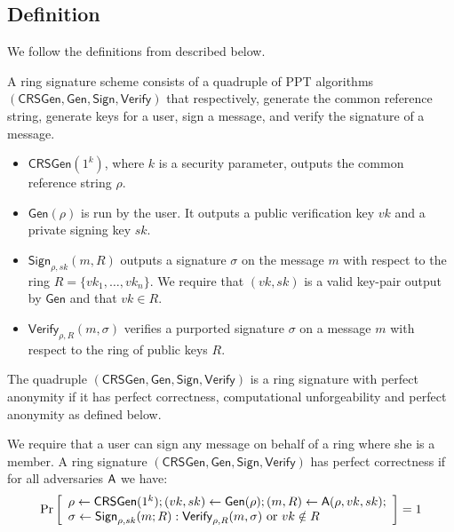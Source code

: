 
\subsection{Definition}
We follow the definitions from \cite{ICALP:ChaGroSah07} described below.

\begin{definition}
A ring signature scheme consists of a quadruple of
PPT algorithms $(\mathsf{CRSGen}, \mathsf{Gen}, \mathsf{Sign}, \mathsf{Verify})$ that respectively, generate the common
reference string, generate keys for a user, sign a message, and verify the signature of a
message.
\begin{itemize}
\item $\mathsf{CRSGen}(1^k)$, where $k$ is a security parameter, outputs the common reference
string $\rho$.
\item $\mathsf{Gen}(\rho)$ is run by the user. It outputs a public verification key $vk$ and a private
signing key $sk$.
\item $\mathsf{Sign}_{\rho,sk}(m, R)$ outputs a signature $\sigma$ on the message $m$ with respect to the ring
$R = \{vk_1,\ldots,vk_n\}$. We require that $(vk, sk)$ is a valid key-pair output by $\mathsf{Gen}$
and that $vk \in R$.
\item $\mathsf{Verify}_{\rho,R}(m, \sigma)$ verifies a purported signature $\sigma$ on a message $m$ with respect to
the ring of public keys $R$.
\end{itemize}
The quadruple $(\mathsf{CRSGen}, \mathsf{Gen}, \mathsf{Sign}, \mathsf{Verify})$ is a ring signature with perfect
anonymity if it has perfect correctness, computational unforgeability and perfect
anonymity as defined below.
\end{definition}

\begin{definition}
We require that a user can sign any message on behalf of a ring where she is a member. A ring signature $(\mathsf{CRSGen}, \mathsf{Gen}, \mathsf{Sign}, \mathsf{Verify})$
has perfect correctness if for all adversaries $\mathsf{A}$ we have:
$$
\Pr\left[\begin{array}{l}
\rho\gets\mathsf{CRSGen}(1^k);(vk,sk)\gets\mathsf{Gen}(\rho);(m,R)\gets\mathsf{A}(\rho,vk,sk);\\
\sigma\gets\mathsf{Sign}_{\rho,sk}(m;R):\mathsf{Verify}_{\rho,R}(m,\sigma)\text{ or }vk\notin R
\end{array}\right]=1
$$
\end{definition}

